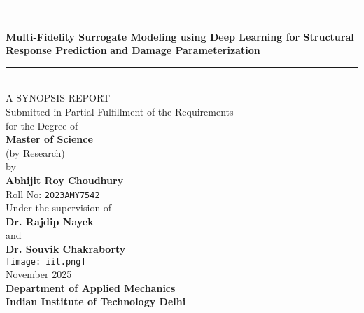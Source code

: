 \documentclass[12pt,a4paper]{report}
\begin{document}
\begin{titlepage}
\centering
\vspace*{-1.5cm}
\rule{\textwidth}{0.6pt} \\[0.3cm]
{\LARGE \textbf{Multi-Fidelity Surrogate Modeling using Deep Learning for Structural Response Prediction}}
{\LARGE \textbf{and Damage Parameterization}}\\[0.25cm]

\rule{\textwidth}{0.6pt} \\[0.5cm]
{\large \textsc{A SYNOPSIS REPORT}}\\[0.3cm]
{\normalsize Submitted in Partial Fulfillment of the Requirements\\
for the Degree of}\\[0.2cm]
{\large \textbf{Master of Science}}\\
{\large (by Research)}\\[0.08cm]
\large by\\[0.2cm]
{\Large \textbf{Abhijit Roy Choudhury}}\\[0.08cm]
{\normalsize Roll No: \texttt{2023AMY7542}}\\[0.5cm]

{\normalsize Under the supervision of}\\[0.5cm]
{\large \textbf{Dr. Rajdip Nayek}}\\
{\large and}\\
{\large \textbf{Dr. Souvik Chakraborty}}\\[1 cm]
\texttt{[image: iit.png]} \\[1 cm]
{\large November 2025} \\[0.2cm]
{\large \textbf{Department of Applied Mechanics}}\\
{\large \textbf{Indian Institute of Technology Delhi}}
\end{titlepage}

\end{document}
